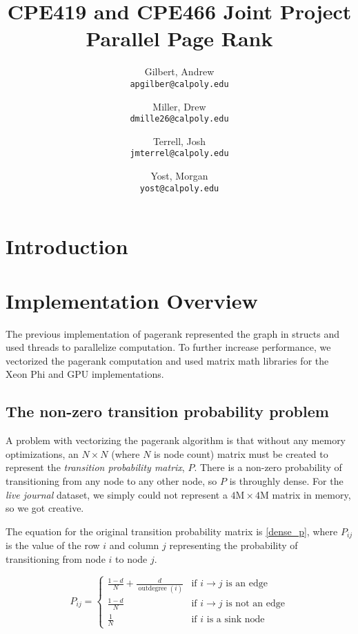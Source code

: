 \documentclass[draft]{report}
\title{CPE419 and CPE466 Joint Project\\Parallel Page Rank}
\author{
  Gilbert, Andrew\\
  \texttt{apgilber@calpoly.edu}
  \and
  Miller, Drew\\
  \texttt{dmille26@calpoly.edu}
  \and
  Terrell, Josh\\
  \texttt{jmterrel@calpoly.edu}
  \and
  Yost, Morgan\\
  \texttt{yost@calpoly.edu}
}
\date{}
\begin{document}
\maketitle

\begin{abstract}
\end{abstract}

\section{Introduction}

\section{Implementation Overview}
The previous implementation of pagerank represented the graph in structs and used threads to parallelize computation. To further increase performance, we vectorized the pagerank computation and used matrix math libraries for the Xeon Phi and GPU implementations.

\subsection{The non-zero transition probability problem}
A problem with vectorizing the pagerank algorithm is that without any memory optimizations, an $N\times N$ (where $N$ is node count) matrix must be created to represent the \textit{transition probability matrix}, $P$. There is a non-zero probability of transitioning from any node to any other node, so $P$ is throughly dense. For the \textit{live journal} dataset, we simply could not represent a $4\text{M} \times 4\text{M}$ matrix in memory, so we got creative.

The equation for the original transition probability matrix is \vref{dense_p}, where $P_{ij}$ is the value of the row $i$ and column $j$ representing the probability of transitioning from node $i$ to node $j$.


\begin{equation}
\label{dense_p}
P_{ij} = 
\begin{cases}
  \frac{1-d}{N} + \frac{d}{\operatorname{outdegree}(i)} & \text{if $i\rightarrow j$ is an edge}\\
  \frac{1-d}{N}                                          & \text{if $i\rightarrow j$ is not an edge}\\
  \frac{1}{N}                                            & \text{if $i$ is a sink node}
\end{cases}
\end{equation}
\end{document}

